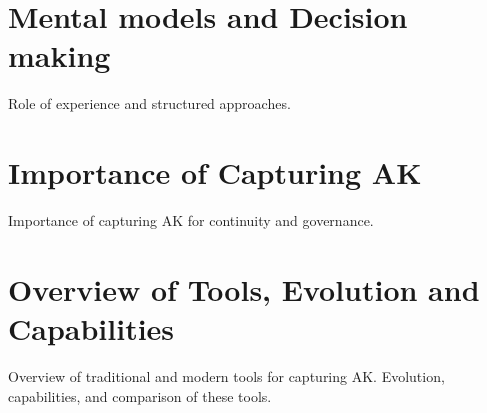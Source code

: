     \section{Mental models and Decision making}
        Role of experience and structured approaches.
    \section{Importance of Capturing AK}
        Importance of capturing AK for continuity and governance.
    \section{Overview of Tools, Evolution and Capabilities}
        Overview of traditional and modern tools for capturing AK.
        Evolution, capabilities, and comparison of these tools.